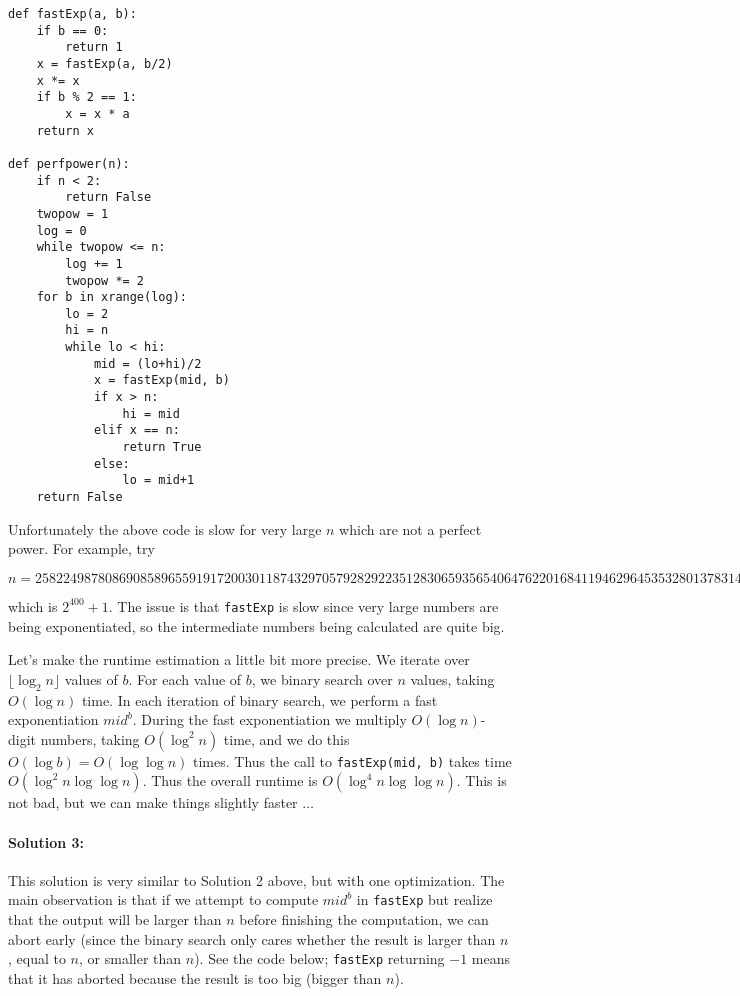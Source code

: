 \documentclass[11pt]{article}
\begin{document}
\begin{verbatim}
def fastExp(a, b):
    if b == 0:
        return 1
    x = fastExp(a, b/2)
    x *= x
    if b % 2 == 1:
        x = x * a
    return x

def perfpower(n):
    if n < 2:
        return False
    twopow = 1
    log = 0
    while twopow <= n:
        log += 1
        twopow *= 2
    for b in xrange(log):
        lo = 2
        hi = n
        while lo < hi:
            mid = (lo+hi)/2
            x = fastExp(mid, b)
            if x > n:
                hi = mid
            elif x == n:
                return True
            else:
                lo = mid+1
    return False
\end{verbatim}

Unfortunately the above code is slow for very large $n$ which are not a perfect power. For example, try
\begin{tiny}
$$
 n = 2582249878086908589655919172003011874329705792829223512830659356540647622016841194629645353280137831435903171972747493377
$$
\end{tiny}
which is $2^{400} + 1$. The issue is that \texttt{fastExp} is slow since very large numbers are being exponentiated, so the intermediate numbers being calculated are quite big.

Let's make the runtime estimation a little bit more precise. We iterate over $\lfloor \log_2 n\rfloor$ values of $b$. For each value of $b$, we binary search over $n$ values, taking $O(\log n)$ time. In each iteration of binary search, we perform a fast exponentiation $mid^b$. During the fast exponentiation we multiply $O(\log n)$-digit numbers, taking $O(\log^2 n)$ time, and we do this $O(\log b) = O(\log\log n)$ times. Thus the call to \texttt{fastExp(mid, b)} takes time $O(\log^2 n\log\log n)$. Thus the overall runtime is $O(\log^4 n\log\log n)$. This is not bad, but we can make things slightly faster $\ldots$

\paragraph{Solution 3:} This solution is very similar to Solution 2 above, but with one optimization. The main observation is that if we attempt to compute $mid^b$ in \texttt{fastExp} but realize that the output will be larger than $n$ before finishing the computation, we can abort early (since the binary search only cares whether the result is larger than $n$, equal to $n$, or smaller than $n$). See the code below; \texttt{fastExp} returning $-1$ means that it has aborted because the result is too big (bigger than $n$).
\end{document}
